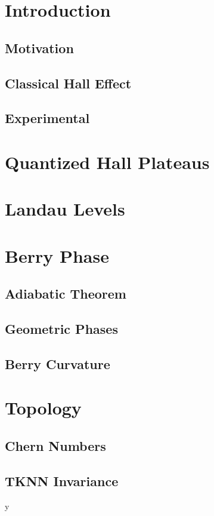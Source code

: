 \documentclass[11pt, twocolumn]{article}
\date{}
\begin{document}


\onecolumn
\tableofcontents
\newpage

\twocolumn


\section{Introduction}
\subsection{Motivation}
\subsection{Classical Hall Effect}
\subsection{Experimental}


\section{Quantized Hall Plateaus}

\section{Landau Levels}

\section{Berry Phase}
\subsection{Adiabatic Theorem}
\subsection{Geometric Phases}
\subsection{Berry Curvature}


\section{Topology}
\subsection{Chern Numbers}
\subsection{TKNN Invariance}

y
\end{document}
